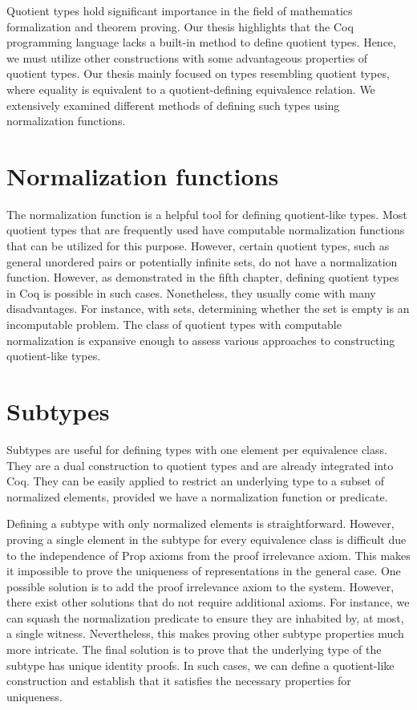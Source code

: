 Quotient types hold significant importance in the field of mathematics formalization and theorem proving. Our thesis highlights that the Coq programming language lacks a built-in method to define quotient types. Hence, we must utilize other constructions with some advantageous properties of quotient types. Our thesis mainly focused on types resembling quotient types, where equality is equivalent to a quotient-defining equivalence relation. We extensively examined different methods of defining such types using normalization functions.
\section{Normalization functions}
The normalization function is a helpful tool for defining quotient-like types. Most quotient types that are frequently used have computable normalization functions that can be utilized for this purpose. However, certain quotient types, such as general unordered pairs or potentially infinite sets, do not have a normalization function. However, as demonstrated in the fifth chapter, defining quotient types in Coq is possible in such cases. Nonetheless, they usually come with many disadvantages. For instance, with sets, determining whether the set is empty is an incomputable problem. The class of quotient types with computable normalization is expansive enough to assess various approaches to constructing quotient-like types.
\section{Subtypes}
Subtypes are useful for defining types with one element per equivalence class. They are a dual construction to quotient types and are already integrated into Coq. They can be easily applied to restrict an underlying type to a subset of normalized elements, provided we have a normalization function or predicate.

Defining a subtype with only normalized elements is straightforward. However, proving a single element in the subtype for every equivalence class is difficult due to the independence of Prop axioms from the proof irrelevance axiom. This makes it impossible to prove the uniqueness of representations in the general case. One possible solution is to add the proof irrelevance axiom to the system. However, there exist other solutions that do not require additional axioms. For instance, we can squash the normalization predicate to ensure they are inhabited by, at most, a single witness. Nevertheless, this makes proving other subtype properties much more intricate. The final solution is to prove that the underlying type of the subtype has unique identity proofs. In such cases, we can define a quotient-like construction and establish that it satisfies the necessary properties for uniqueness.

